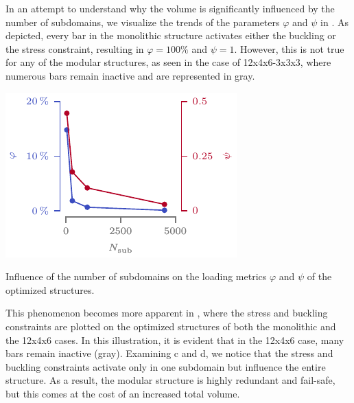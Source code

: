     In an attempt to understand why the volume is significantly influenced by the number of subdomains, we visualize the trends of the parameters $\varphi$ and $\psi$ in . As depicted, every bar in the monolithic structure activates either the buckling or the stress constraint, resulting in $\varphi=100\%$ and $\psi=1$. However, this is not true for any of the modular structures, as seen in the case of 12x4x6-3x3x3, where numerous bars remain inactive and are represented in gray.
    \begin{marginfigure}
        \centering
        \includegraphics[width=\linewidth]{figures/05_cellular_opt/00_module_scale_tab/scale_tab_param.pdf}
        \caption{Influence of the number of subdomains on the loading metrics $\varphi$ and $\psi$ of the optimized structures.}
        \label{fig:05_scale_param}
    \end{marginfigure}
    This phenomenon becomes more apparent in , where the stress and buckling constraints are plotted on the optimized structures of both the monolithic and the 12x4x6 cases. In this illustration, it is evident that in the 12x4x6 case, many bars remain inactive (gray). Examining c and d, we notice that the stress and buckling constraints activate only in one subdomain but influence the entire structure. As a result, the modular structure is highly redundant and fail-safe, but this comes at the cost of an increased total volume.
